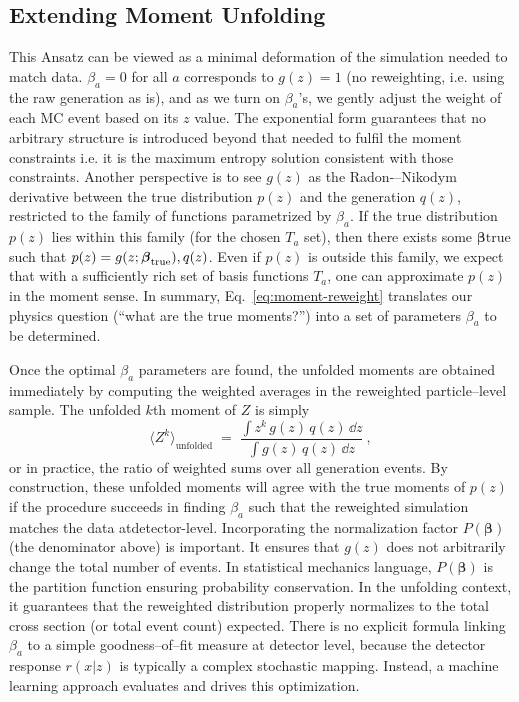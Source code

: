     \subsection{Extending Moment Unfolding}
        This Ansatz can be viewed as a minimal deformation of the simulation needed to match data.
        $\beta_a = 0$ for all $a$ corresponds to $g(z)=1$ (no reweighting, i.e. using the raw generation as is), and as we turn on $\beta_a$’s, we gently adjust the weight of each MC event based on its $z$ value.
        The exponential form guarantees that no arbitrary structure is introduced beyond that needed to fulfil the moment constraints i.e. it is the maximum entropy solution consistent with those constraints.\kd{}
        Another perspective is to see $g(z)$ as the Radon-–Nikodym derivative between the true distribution $p(z)$ and the generation $q(z)$, restricted to the family of functions parametrized by $\beta_a$.\kd{}
        If the true distribution $p(z)$ lies within this family (for the chosen $T_a$ set), then there exists some $\boldsymbol{\beta}{\text{true}}$ such that $p(z) = g(z; \vb*{\beta}_{\text{true}}),q(z)$.
        Even if $p(z)$ is outside this family, we expect that with a sufficiently rich set of basis functions $T_a$, one can approximate $p(z)$ in the moment sense.
        In summary, Eq.~\ref{eq:moment-reweight} translates our physics question (“what are the true moments?”) into a set of parameters $\beta_a$ to be determined.

        Once the optimal $\beta_a$ parameters are found, the unfolded moments are obtained immediately by computing the weighted averages in the reweighted particle--level sample.
        The unfolded $k$th moment of $Z$ is simply
        \[
            \langle Z^k \rangle_{\text{unfolded}} \;=\; \frac{\int z^k\,g(z)\,q(z)\,\dd z}{\int g(z)\,q(z)\,\dd z} ~,
        \]
        or in practice, the ratio of weighted sums over all generation events.
        By construction, these unfolded moments will agree with the true moments of $p(z)$ if the procedure succeeds in finding $\beta_a$ such that the reweighted simulation matches the data atdetector-level.
        Incorporating the normalization factor $P(\boldsymbol{\beta})$ (the denominator above) is important.
        It ensures that $g(z)$ does not arbitrarily change the total number of events.
        In statistical mechanics language, $P(\boldsymbol{\beta})$ is the partition function ensuring probability conservation.
        In the unfolding context, it guarantees that the reweighted distribution properly normalizes to the total cross section (or total event count) expected.
        There is no explicit formula linking $\beta_a$ to a simple goodness--of--fit measure at detector level, because the detector response $r(x|z)$ is typically a complex stochastic mapping.
        Instead, a machine learning approach evaluates and drives this optimization.
        
